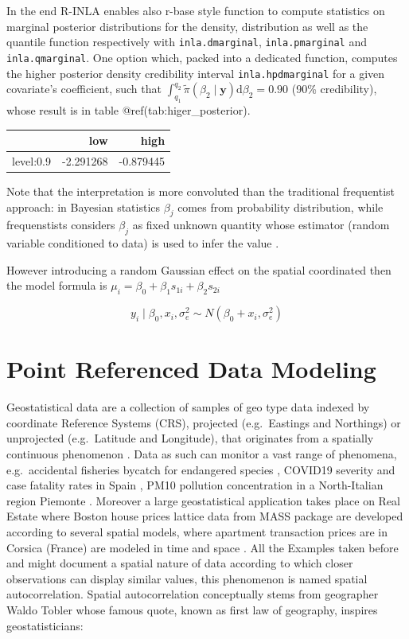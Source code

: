 \documentclass[
  12pt,
  a4paper,
  oneside]{book}
\newcommand{\passthrough}[1]{#1}
\theoremstyle{definition}
\theoremstyle{definition}
\theoremstyle{definition}
\theoremstyle{remark}
\begin{document}
In the end R-INLA enables also r-base style function to compute statistics on marginal posterior distributions for the density, distribution as well as the quantile function respectively with \passthrough{\lstinline!inla.dmarginal!}, \passthrough{\lstinline!inla.pmarginal!} and \passthrough{\lstinline!inla.qmarginal!}. One option which, packed into a dedicated function, computes the higher posterior density credibility interval \passthrough{\lstinline!inla.hpdmarginal!} for a given covariate's coefficient, such that \(\int_{q_{1}}^{q_{2}} \tilde{\pi}\left(\beta_{2} \mid \boldsymbol{y}\right) \mathrm{d} \beta_{2}=0.90\) (90\% credibility), whose result is in table @ref(tab:higer\_posterior).

\begin{tabular}{lrr}
\toprule
  & low & high\\
\midrule
level:0.9 & -2.291268 & -0.879445\\
\bottomrule
\end{tabular}

Note that the interpretation is more convoluted \citeyearpar{wang2018bayesian} than the traditional frequentist approach: in Bayesian statistics \(\beta_{j}\) comes from probability distribution, while frequenstists considers \(\beta_{j}\) as fixed unknown quantity whose estimator (random variable conditioned to data) is used to infer the value \citeyearpar{Blangiardo-Cameletti}.

However introducing a random Gaussian effect on the spatial coordinated then the model formula is \(\mu_{i}=\beta_{0}+\beta_{1} s_{1 i}+\beta_{2} s_{2 i}\)

\[y_{i} \mid \beta_{0}, x_{i}, \sigma_{e}^{2} \sim N\left(\beta_{0}+x_{i}, \sigma_{e}^{2}\right)\]

\hypertarget{prdm}{%
\chapter{Point Referenced Data Modeling}\label{prdm}}

Geostatistical data are a collection of samples of geo type data indexed by coordinate Reference Systems (CRS), projected (e.g.~Eastings and Northings) or unprojected (e.g.~Latitude and Longitude), that originates from a spatially continuous phenomenon \citep{Moraga2019}. Data as such can monitor a vast range of phenomena, e.g.~accidental fisheries bycatch for endangered species \citep{CosandeyGodin2015}, COVID19 severity and case fatality rates in Spain \citep{Moragacovid2020}, PM10 pollution concentration in a North-Italian region Piemonte \citep{Cameletti2012}. Moreover a large geostatistical application takes place on Real Estate where Boston house prices lattice data from MASS \citet{mass} package \citet{rubiorealestate} are developed according to several spatial models, where apartment transaction prices are in Corsica (France) are modeled in time and space \citep{Ling}. All the Examples taken before and might document a spatial nature of data according to which closer observations can display similar values, this phenomenon is named spatial autocorrelation. Spatial autocorrelation conceptually stems from geographer Waldo Tobler whose famous quote, known as first law of geography, inspires geostatisticians:
\end{document}
